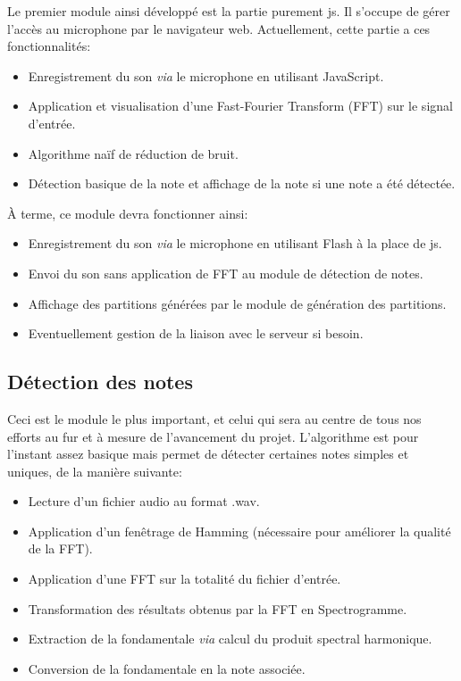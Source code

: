 \documentclass[12pt]{article}
\begin{document}
\par Le premier module ainsi développé est la partie purement js. Il s'occupe de gérer l'accès au microphone par le navigateur web. Actuellement, cette partie a ces fonctionnalités:
\begin{itemize}

\item Enregistrement du son \emph{via} le microphone en utilisant JavaScript.
\item Application et visualisation d'une Fast-Fourier Transform (FFT) sur le signal d'entrée.
\item Algorithme naïf de réduction de bruit.
\item Détection basique de la note et affichage de la note si une note a été détectée.

\end{itemize}

\par \`A terme, ce module devra fonctionner ainsi:
\begin{itemize}

\item Enregistrement du son \emph{via} le microphone en utilisant Flash à la place de js.
\item Envoi du son sans application de FFT au module de détection de notes.
\item Affichage des partitions générées par le module de génération des partitions.
\item Eventuellement gestion de la liaison avec le serveur si besoin.

\end{itemize}
\subsection{Détection des notes}

\par Ceci est le module le plus important, et celui qui sera au centre de tous nos efforts au fur et à mesure de l'avancement du projet. L'algorithme est pour l'instant assez basique mais permet de détecter certaines notes simples et uniques, de la manière suivante:

\begin{itemize}

\item Lecture d'un fichier audio au format .wav.
\item Application d'un fenêtrage de Hamming (nécessaire pour améliorer la qualité de la FFT).
\item Application d'une FFT sur la totalité du fichier d'entrée.
\item Transformation des résultats obtenus par la FFT en Spectrogramme.
\item Extraction de la fondamentale \emph{via} calcul du produit spectral harmonique.
\item Conversion de la fondamentale en la note associée.

\end{itemize}
\end{document}

